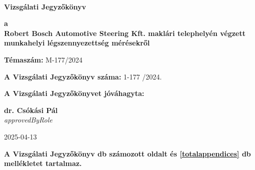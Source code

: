 \documentclass[a4paper,12pt]{article}
\begin{document}
	
	
	\thispagestyle{firstpage}
	
	\begin{flushleft}
		{\footnotesize  
			\textbf{
				 \\
				\vspace{-2mm} 
			}
		}
	\end{flushleft}
	
	\vfill
	
	\begin{center}
		{\Huge \textbf{Vizsgálati Jegyzőkönyv}}
	\end{center}
	
	\vfill
	
	\begin{center}
		\large
		\textbf{a} \\
		\textbf{Robert Bosch Automotive Steering Kft. maklári telephelyén
végzett munkahelyi légszennyezettség mérésekről}
	\end{center}
	
	\vfill
	
	\begin{center}
		\textbf{Témaszám:} M-177/2024
	\end{center}    
	
	\vfill
	
	\begin{center}
		\textbf{A Vizsgálati Jegyzőkönyv száma:} 1-177 /2024.
	\end{center}
	
	\begin{center}
		\textbf{A Vizsgálati Jegyzőkönyvet jóváhagyta:}
	\end{center}    
	
	\vfill
	
	\begin{center}
		\textbf{dr. Csókási Pál}\\
		\textit{{{approvedByRole}}} \\
	\end{center}    
	
	\vfill
	
	\begin{center}
		2025-04-13
	\end{center}    
	
	\vfill
	
	\begin{center}
		\textbf{A Vizsgálati Jegyzőkönyv \pageref{LastPage} db számozott oldalt és \ref{totalappendices} db mellékletet tartalmaz.}
	\end{center}    
	
\end{document}
